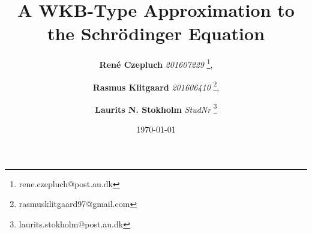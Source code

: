 \documentclass[danish, a4paper, onecolumn, oneside]{memoir}
\title{A WKB-Type Approximation to the Schrödinger Equation}
\author{%
        \textbf{René Czepluch} \textit{201607229}       \thanks{rene.czepluch@post.au.dk},
   \and \textbf{Rasmus Klitgaard} \textit{201606410}    \thanks{rasmusklitgaard97@gmail.com},
   \and \textbf{Laurits N. Stokholm} \textit{StudNr} \thanks{laurits.stokholm@post.au.dk}

   }
\date{\today}
\begin{document}
\begin{titlingpage}
\maketitle
\end{titlingpage}
\noindent







\end{document}
